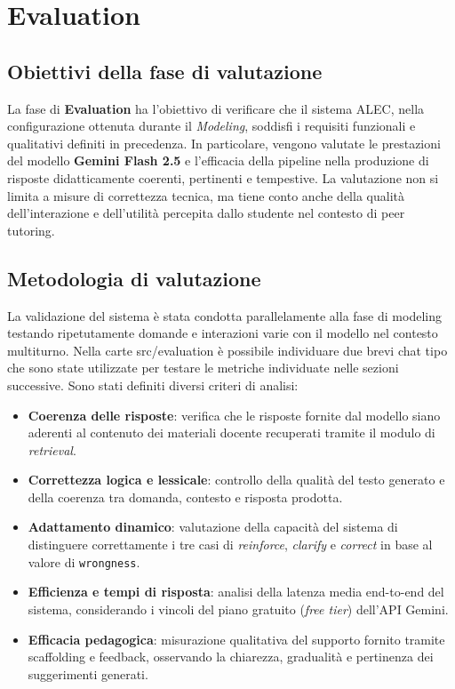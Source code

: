 \documentclass[a4paper,9pt]{article}
\begin{document}
\section{Evaluation}

\subsection{Obiettivi della fase di valutazione}

La fase di \textbf{Evaluation} ha l’obiettivo di verificare che il sistema ALEC, nella configurazione ottenuta durante il \textit{Modeling}, soddisfi i requisiti funzionali e qualitativi definiti in precedenza. 
In particolare, vengono valutate le prestazioni del modello \textbf{Gemini Flash 2.5} e l’efficacia della pipeline nella produzione di risposte didatticamente coerenti, pertinenti e tempestive. 
La valutazione non si limita a misure di correttezza tecnica, ma tiene conto anche della qualità dell’interazione e dell’utilità percepita dallo studente nel contesto di peer tutoring.

\subsection{Metodologia di valutazione}

La validazione del sistema è stata condotta parallelamente alla fase di modeling testando ripetutamente domande e interazioni varie con il modello nel contesto multiturno. Nella carte src/evaluation è possibile individuare due brevi chat tipo che sono state utilizzate per testare le metriche individuate nelle sezioni successive.
Sono stati definiti diversi criteri di analisi:

\begin{itemize}
	\item \textbf{Coerenza delle risposte}: verifica che le risposte fornite dal modello siano aderenti al contenuto dei materiali docente recuperati tramite il modulo di \textit{retrieval}.
	\item \textbf{Correttezza logica e lessicale}: controllo della qualità del testo generato e della coerenza tra domanda, contesto e risposta prodotta.
	\item \textbf{Adattamento dinamico}: valutazione della capacità del sistema di distinguere correttamente i tre casi di \textit{reinforce}, \textit{clarify} e \textit{correct} in base al valore di \texttt{wrongness}.
	\item \textbf{Efficienza e tempi di risposta}: analisi della latenza media end-to-end del sistema, considerando i vincoli del piano gratuito (\textit{free tier}) dell’API Gemini.
	\item \textbf{Efficacia pedagogica}: misurazione qualitativa del supporto fornito tramite scaffolding e feedback, osservando la chiarezza, gradualità e pertinenza dei suggerimenti generati.
\end{itemize}
\end{document}
